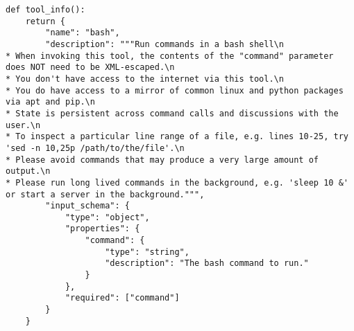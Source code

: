 \begin{lstlisting}
def tool_info():
    return {
        "name": "bash",
        "description": """Run commands in a bash shell\n
* When invoking this tool, the contents of the "command" parameter does NOT need to be XML-escaped.\n
* You don't have access to the internet via this tool.\n
* You do have access to a mirror of common linux and python packages via apt and pip.\n
* State is persistent across command calls and discussions with the user.\n
* To inspect a particular line range of a file, e.g. lines 10-25, try 'sed -n 10,25p /path/to/the/file'.\n
* Please avoid commands that may produce a very large amount of output.\n
* Please run long lived commands in the background, e.g. 'sleep 10 &' or start a server in the background.""",
        "input_schema": {
            "type": "object",
            "properties": {
                "command": {
                    "type": "string",
                    "description": "The bash command to run."
                }
            },
            "required": ["command"]
        }
    }
\end{lstlisting}